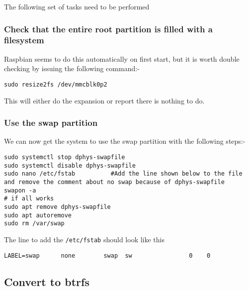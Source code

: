 \documentclass[Draft]{akc}
\begin{document}
The following set of tasks need to be performed

\subsubsection{Check that the entire root partition is filled with a filesystem}

Raspbian seems to do this automatically on first start, but it is worth double checking by
issuing the following command:-

\begin{lstlisting}
sudo resize2fs /dev/mmcblk0p2
\end{lstlisting}

This will either do the expansion or report there is nothing to do.
\subsubsection{Use the swap partition}
We can now get the system to use the swap partition with the following steps:-
\begin{lstlisting}
sudo systemctl stop dphys-swapfile
sudo systemctl disable dphys-swapfile
sudo nano /etc/fstab          #Add the line shown below to the file and remove the comment about no swap because of dphys-swapfile
swapon -a
# if all works
sudo apt remove dphys-swapfile
sudo apt autoremove
sudo rm /var/swap
\end{lstlisting}

The line to add the \texttt{/etc/fstab} should look like this
\begin{lstlisting}
LABEL=swap      none        swap  sw                0    0
\end{lstlisting}


\subsection{Convert to btrfs}
\end{document}
